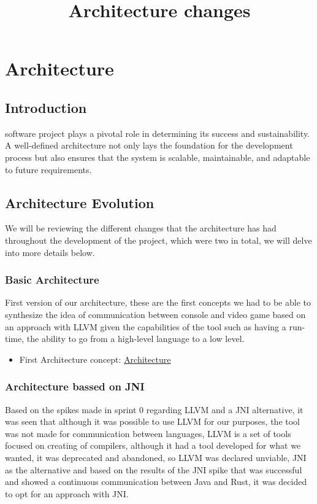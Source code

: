 \documentclass[a4paper,12pt]{article}
\title{Architecture changes}
\author{}
\date{}
\begin{document}
\maketitle

\tableofcontents
\newpage

\section{Architecture}
\subsection{Introduction}
software project plays a pivotal role in determining its success and sustainability. A well-defined architecture not only lays the foundation for the development process but also ensures that the system is scalable, maintainable, and adaptable to future requirements.
\subsection{Architecture Evolution}
We will be reviewing the different changes that the architecture has had throughout the development of the project, which were two in total, we will delve into more details below.
\subsubsection{Basic Architecture}
First version of our architecture, these are the first concepts we had to be able to synthesize the idea of communication between console and video game based on an approach with LLVM given the capabilities of the tool such as having a run-time, the ability to go from a high-level language to a low level.

\begin{itemize}
    \item First Architecture concept: \href{https://github.com/Pending-Name-21/arquitecture/pull/1/files}{Architecture}
\end{itemize}

\subsubsection{Architecture bassed on JNI}
Based on the spikes made in sprint 0 regarding LLVM and a JNI alternative, it was seen that although it was possible to use LLVM for our purposes, the tool was not made for communication between languages, LLVM is a set of tools focused on creating of compilers, although it had a tool developed for what we wanted, it was deprecated and abandoned, so LLVM was declared unviable, JNI as the alternative and based on the results of the JNI spike that was successful and showed a continuous communication between Java and Rust, it was decided to opt for an approach with JNI.
\end{document}
